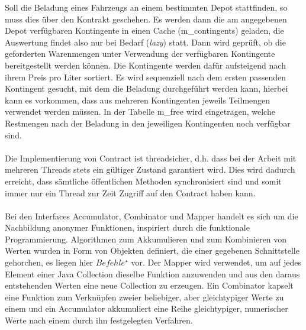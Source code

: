 \noindent
Soll die Beladung eines Fahrzeugs an einem bestimmten Depot stattfinden, so muss dies über den Kontrakt geschehen. Es werden dann die am angegebenen Depot verfügbaren Kontingente in einen Cache (\textsf{m\_contingents}) geladen, die Auswertung findet also nur bei Bedarf (\emph{lazy}) statt. Dann wird geprüft, ob die geforderten Warenmengen unter Verwendung der verfügbaren Kontingente bereitgestellt werden können. Die Kontingente werden dafür aufsteigend nach ihrem Preis pro Liter sortiert. Es wird sequenziell nach dem ersten passenden Kontingent gesucht, mit dem die Beladung durchgeführt werden kann, hierbei kann es vorkommen, dass aus mehreren Kontingenten jeweils Teilmengen verwendet werden müssen. In der Tabelle \textsf{m\_free} wird eingetragen, welche Restmengen nach der Beladung in den jeweiligen Kontingenten noch verfügbar sind. \\
\\
Die Implementierung von \textsf{Contract} ist threadsicher, d.h. dass bei der Arbeit mit mehreren Threads stets ein gültiger Zustand garantiert wird. Dies wird dadurch erreicht, dass sämtliche öffentlichen Methoden synchronisiert sind und somit immer nur ein Thread zur Zeit Zugriff auf den \textsf{Contract} haben kann. \\
\\
Bei den Interfaces \textsf{Accumulator}, \textsf{Combinator} und \textsf{Mapper} handelt es sich um die Nachbildung anonymer Funktionen, inspiriert durch die funktionale Programmierung. Algorithmen zum Akkumulieren und zum Kombinieren von Werten wurden in Form von Objekten definiert, die einer gegebenen Schnittstelle gehorchen, es liegen hier $Befehle^\star$ vor. Der \textsf{Mapper} wird verwendet, um auf jedes Element einer \textsf{Java Collection} dieselbe Funktion anzuwenden und aus den daraus entstehenden Werten eine neue \textsf{Collection} zu erzeugen. Ein \textsf{Combinator} kapselt eine Funktion zum Verknüpfen zweier beliebiger, aber gleichtypiger Werte zu einem und ein \textsf{Accumulator} akkumuliert eine Reihe gleichtypiger, numerischer Werte nach einem durch ihn festgelegten Verfahren.


